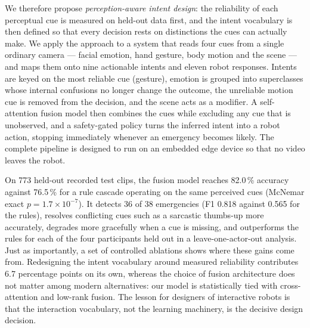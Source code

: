 We therefore propose \emph{perception-aware intent design}: the reliability
of each perceptual cue is measured on held-out data first, and the intent
vocabulary is then defined so that every decision rests on distinctions the
cues can actually make. We apply the approach to a system that reads four cues
from a single ordinary camera --- facial emotion, hand gesture, body motion and
the scene --- and maps them onto nine actionable intents and eleven robot
responses. Intents are keyed on the most reliable cue (gesture), emotion is
grouped into superclasses whose internal confusions no longer change the
outcome, the unreliable motion cue is removed from the decision, and the scene
acts as a modifier. A self-attention fusion model then combines the cues while
excluding any cue that is unobserved, and a safety-gated policy turns the
inferred intent into a robot action, stopping immediately whenever an
emergency becomes likely. The complete pipeline is designed to run on an
embedded edge device so that no video leaves the robot.

On 773 held-out recorded test clips, the fusion model reaches 82.0\,\%
accuracy against 76.5\,\% for a rule cascade operating on the same perceived
cues (McNemar exact $p = 1.7 \times 10^{-7}$). It detects 36 of 38
emergencies (F1 0.818 against 0.565 for the rules), resolves conflicting cues
such as a sarcastic thumbs-up more accurately, degrades more gracefully when a
cue is missing, and outperforms the rules for each of the four participants held out in a
leave-one-actor-out analysis. Just as importantly, a set of controlled
ablations shows where these gains come from. Redesigning the intent vocabulary
around measured reliability contributes 6.7 percentage points on its own,
whereas the choice of fusion architecture does not matter among modern
alternatives: our model is statistically tied with cross-attention and
low-rank fusion. The lesson for designers of interactive robots is that the
interaction vocabulary, not the learning machinery, is the decisive design
decision.

